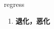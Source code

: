 
\begin{frame}
{\huge regress}
\begin{center}
\begin{enumerate}\Large
  \item \textbf{退化，恶化}
\end{enumerate}
\end{center}
\end{frame}
